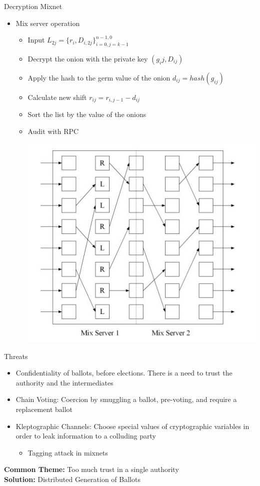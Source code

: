 \documentclass{beamer}
\begin{document}
\begin{frame}[allowframebreaks]{Decryption Mixnet}
\begin{itemize}
\item Mix server operation
\begin{itemize}
\item Input $L_{2j}=\{r_i,D_{i,2j}\}_{i=0,j=k-1}^{n-1,0}$
\item Decrypt the onion with the private key $(g_ij,D_{ij})$
\item Apply the hash to the germ value of the onion $d_{ij}=hash(g_{ij})$
\item Calculate new shift  $r_{ij} = r_{i,j-1}-d_{ij}$
\item Sort the list by the value of the onions
\item Audit with RPC
\begin{center}
\includegraphics[scale=0.5]{auditrpc}
\end{center}
\end{itemize}

\end{itemize}

\end{frame}

\begin{frame}{Threats}
\begin{itemize}
\item Confidentiality of ballots, before elections. There is a need to trust the authority and the intermediates
\item Chain Voting: Coercion by smuggling a ballot, pre-voting, and require a replacement ballot
\item Kleptographic Channels: Choose special values of cryptographic variables in order to leak information to a colluding party
\begin{itemize}
	\item Tagging attack in mixnets
\end{itemize}
\end{itemize}
\textbf{Common Theme:} Too much trust in a single authority \\
\textbf{Solution:} Distributed Generation of Ballots
\end{frame}
\end{document}
